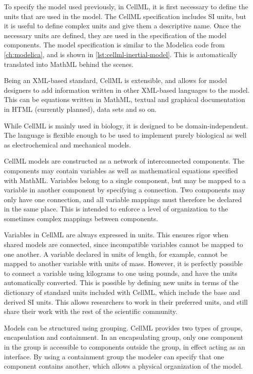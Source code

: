 \documentclass[\rootfolder/main.tex]{subfiles}
\begin{document}
To specify the model used previously, in CellML, it is first necessary to define the units that are used in the model.
The CellML specification includes SI units, but it is useful to define complex units and give them a descriptive name.
Once the necessary units are defined, they are used in the specification of the model components.
The model specification is similar to the Modelica code from \cref{ch:modelica}, and is shown in \cref{lst:cellml-inertial-model}.
This is automatically translated into MathML behind the scenes.

Being an XML-based standard, CellML is extensible, and allows for model designers to add information written in other XML-based languages to the model.
This can be equations written in MathML, textual and graphical documentation in HTML (currently planned), data sets and so on.

While CellML is mainly used in biology, it is designed to be domain-independent.
The language is flexible enough to be used to implement purely biological as well as electrochemical and mechanical models.

CellML models are constructed as a network of interconnected components.
The components may contain variables as well as mathematical equations specified with MathML.
Variables belong to a single component, but may be mapped to a variable in another component by specifying a connection.
Two components may only have one connection, and all variable mappings must therefore be declared in the same place.
This is intended to enforce a level of organization to the sometimes complex mappings between components.

Variables in CellML are always expressed in units.
This ensures rigor when shared models are connected, since incompatible variables cannot be mapped to one another.
A variable declared in units of length, for example, cannot be mapped to another variable with units of mass.
However, it is perfectly possible to connect a variable using kilograms to one using pounds, and have the units automatically converted.
This is possible by defining new units in terms of the dictionary of standard units included with CellML, which include the base and derived SI units.
This allows researchers to work in their preferred units, and still share their work with the rest of the scientific community.

Models can be structured using grouping.
CellML provides two types of groups, encapsulation and containment.
In an encapsulating group, only one component in the group is accessible to components outside the group, in effect acting as an interface.
By using a containment group the modeler can specify that one component contains another, which allows a physical organization of the model.
\end{document}
